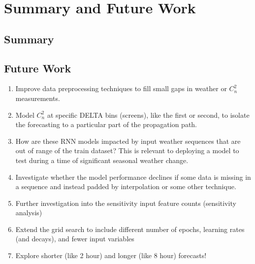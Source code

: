 \chapter{Summary and Future Work}
\label{ch6}

\section{Summary}

\section{Future Work}
\begin{enumerate}
	\item Improve data preprocessing techniques to fill small gaps in weather or $C_{n}^{2}$ measurements.
	\item Model $C_{n}^{2}$ at specific DELTA bins (screens), like the first or second, to isolate the forecasting to a particular part of the propagation path.
	\item How are these RNN models impacted by input weather sequences that are out of range of the train dataset? This is relevant to deploying a model to test during a time of significant seasonal weather change.
	\item Investigate whether the model performance declines if some data is missing in a sequence and instead padded by interpolation or some other technique.
	\item Further investigation into the sensitivity input feature counts (sensitivity analysis)
	\item Extend the grid search to include different number of epochs, learning rates (and decays), and fewer input variables
	\item Explore shorter (like 2 hour) and longer (like 8 hour) forecasts!
\end{enumerate}